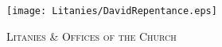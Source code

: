 \fancyhead[RE,LO]{}\fancyhead[RO,LE]{}
\fancyhead[C]{}
\thispagestyle{empty}
{}

\begin{figure}[H]
    \centering
    \texttt{[image: Litanies/DavidRepentance.eps]}
    \caption{\textsc{\Huge{Litanies \& Offices of the Church}}}
\end{figure}